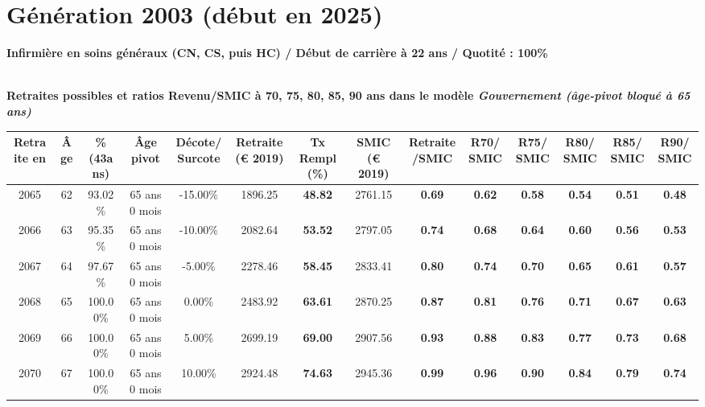 \newpage 
 
\section{Génération 2003 (début en 2025)\label{Infirmier_100_2003_22_0}} 
 
{\bf \noindent Infirmière en soins généraux (CN, CS, puis HC) / Début de carrière à 22 ans / Quotité : 100\%}  ~ 

 ~\\{\bf \noindent Retraites possibles et ratios Revenu/SMIC à 70, 75, 80, 85, 90 ans dans le modèle \emph{Gouvernement (âge-pivot bloqué à 65 ans)}}  
 
\begin{adjustbox}{max width=\textwidth} 
\begin{tabular}[htb]{|c|c||c|c|c||c|c||c|c||c|c|c|c|c|} 
\hline 
 Retraite en &  Âge &  \%(43ans) &  Âge pivot &  Décote/Surcote &  Retraite (\euro{} 2019) &  Tx Rempl(\%) &  SMIC (\euro{} 2019) &  Retraite/SMIC &  R70/SMIC &  R75/SMIC &  R80/SMIC &  R85/SMIC &  R90/SMIC \\ 
\hline \hline 
 2065 &  62 &  93.02\% &  65 ans 0 mois &  -15.00\% &  1896.25 &  {\bf 48.82} &  2761.15 &  {\bf {\color{red} 0.69}} &  {\bf {\color{red} 0.62}} &  {\bf {\color{red} 0.58}} &  {\bf {\color{red} 0.54}} &  {\bf {\color{red} 0.51}} &  {\bf {\color{red} 0.48}} \\ 
\hline 
 2066 &  63 &  95.35\% &  65 ans 0 mois &  -10.00\% &  2082.64 &  {\bf 53.52} &  2797.05 &  {\bf {\color{red} 0.74}} &  {\bf {\color{red} 0.68}} &  {\bf {\color{red} 0.64}} &  {\bf {\color{red} 0.60}} &  {\bf {\color{red} 0.56}} &  {\bf {\color{red} 0.53}} \\ 
\hline 
 2067 &  64 &  97.67\% &  65 ans 0 mois &  -5.00\% &  2278.46 &  {\bf 58.45} &  2833.41 &  {\bf {\color{red} 0.80}} &  {\bf {\color{red} 0.74}} &  {\bf {\color{red} 0.70}} &  {\bf {\color{red} 0.65}} &  {\bf {\color{red} 0.61}} &  {\bf {\color{red} 0.57}} \\ 
\hline 
 2068 &  65 &  100.00\% &  65 ans 0 mois &  0.00\% &  2483.92 &  {\bf 63.61} &  2870.25 &  {\bf {\color{red} 0.87}} &  {\bf {\color{red} 0.81}} &  {\bf {\color{red} 0.76}} &  {\bf {\color{red} 0.71}} &  {\bf {\color{red} 0.67}} &  {\bf {\color{red} 0.63}} \\ 
\hline 
 2069 &  66 &  100.00\% &  65 ans 0 mois &  5.00\% &  2699.19 &  {\bf 69.00} &  2907.56 &  {\bf {\color{red} 0.93}} &  {\bf {\color{red} 0.88}} &  {\bf {\color{red} 0.83}} &  {\bf {\color{red} 0.77}} &  {\bf {\color{red} 0.73}} &  {\bf {\color{red} 0.68}} \\ 
\hline 
 2070 &  67 &  100.00\% &  65 ans 0 mois &  10.00\% &  2924.48 &  {\bf 74.63} &  2945.36 &  {\bf {\color{red} 0.99}} &  {\bf {\color{red} 0.96}} &  {\bf {\color{red} 0.90}} &  {\bf {\color{red} 0.84}} &  {\bf {\color{red} 0.79}} &  {\bf {\color{red} 0.74}} \\ 
\hline 
\hline 
\end{tabular} 
\end{adjustbox} 
 
